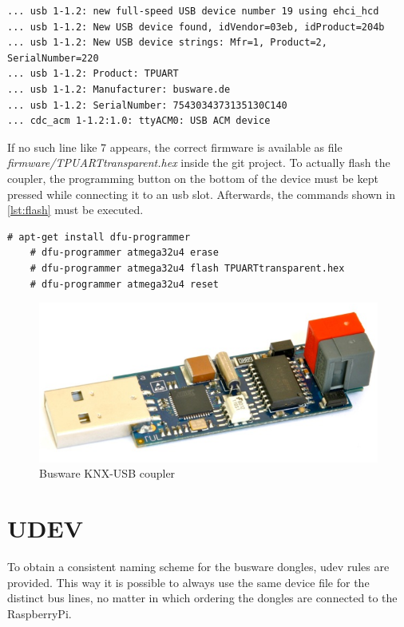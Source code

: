 \begin{lstlisting}[style=BashInputStyle,label=lst:device]
... usb 1-1.2: new full-speed USB device number 19 using ehci_hcd
... usb 1-1.2: New USB device found, idVendor=03eb, idProduct=204b
... usb 1-1.2: New USB device strings: Mfr=1, Product=2, SerialNumber=220
... usb 1-1.2: Product: TPUART
... usb 1-1.2: Manufacturer: busware.de
... usb 1-1.2: SerialNumber: 7543034373135130C140
... cdc_acm 1-1.2:1.0: ttyACM0: USB ACM device
\end{lstlisting}

If no such line like 7 appears, the correct firmware is available as file \textit{firmware/TPUARTtransparent.hex} inside the git project. To actually flash the 
coupler, the programming button on the bottom of the device must be kept pressed while connecting it to an \gls{usb} slot. Afterwards, the commands shown
in \ref{lst:flash} must be executed.

\begin{lstlisting}[style=BashInputStyle,label=lst:flash]
    # apt-get install dfu-programmer
    # dfu-programmer atmega32u4 erase
    # dfu-programmer atmega32u4 flash TPUARTtransparent.hex
    # dfu-programmer atmega32u4 reset
\end{lstlisting}


\begin{figure}
    \centering
    \label{fig:busware}
\includegraphics[scale=0.2]{figures/busware.png}
    \caption{Busware KNX-USB coupler}
\end{figure}

\section{UDEV}

To obtain a consistent naming scheme for the busware dongles, udev rules are provided. This way it is possible to always use the same
device file for the distinct bus lines, no matter in which ordering the dongles are connected to the RaspberryPi.

